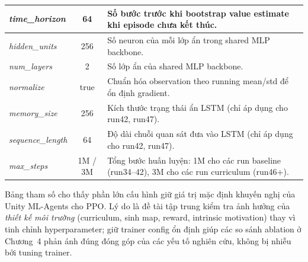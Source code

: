 \begin{table}[H]
\begin{tabular}{|p{4.0cm}|c|p{7.2cm}|}
        \hline
        \emph{time\_horizon}       & 64    & Số bước trước khi bootstrap value estimate khi episode chưa kết thúc. \\
        \hline
        \emph{hidden\_units}       & 256   & Số neuron của mỗi lớp ẩn trong shared MLP backbone. \\
        \hline
        \emph{num\_layers}         & 2     & Số lớp ẩn của shared MLP backbone. \\
        \hline
        \emph{normalize}           & true  & Chuẩn hóa observation theo running mean/std để ổn định gradient. \\
        \hline
        \emph{memory\_size}        & 256   & Kích thước trạng thái ẩn LSTM (chỉ áp dụng cho run42, run47). \\
        \hline
        \emph{sequence\_length}    & 64    & Độ dài chuỗi quan sát đưa vào LSTM (chỉ áp dụng cho run42, run47). \\
        \hline
        \emph{max\_steps}          & 1M / 3M & Tổng bước huấn luyện: 1M cho các run baseline (run34--42), 3M cho các run curriculum (run46+). \\
        \hline
    \end{tabular}
\end{table}

Bảng tham số cho thấy phần lớn cấu hình giữ giá trị mặc định khuyến nghị của Unity ML-Agents cho PPO. Lý do là đề tài tập trung kiểm tra ảnh hưởng của \emph{thiết kế môi trường} (curriculum, sinh map, reward, intrinsic motivation) thay vì tinh chỉnh hyperparameter; giữ trainer config ổn định giúp các so sánh ablation ở Chương~4 phản ánh đúng đóng góp của các yếu tố nghiên cứu, không bị nhiễu bởi tuning trainer.
